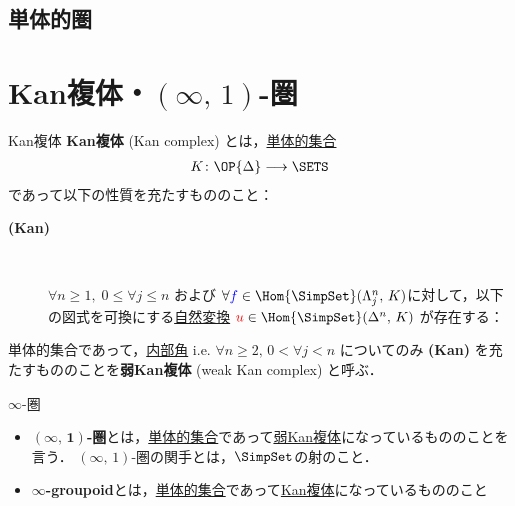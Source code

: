 \documentclass[TQFT_main]{subfiles}
\begin{document}
\subsection{単体的圏}



\section{Kan複体・$(\infty,\, 1)$-圏}

\begin{mydef}[label=def:KanCplx,breakable]{Kan複体}
    \textbf{Kan複体} (Kan complex) とは，\hyperref[def:SimpSet]{単体的集合}
    \begin{align}
        K \colon \OP{\Delta} \lto \SETS
    \end{align}
    であって以下の性質を充たすもののこと：

    \begin{description}
        \item[\textbf{(Kan)}]　
        
        $\forall n \ge 1,\; 0 \le \forall j \le n$ および $\forall \textcolor{blue}{f} \in \Hom{\SimpSet}(\Lambda^n_j,\, K)$に対して，以下の図式を可換にする\hyperref[def:nat]{自然変換} $\textcolor{red}{u} \in \Hom{\SimpSet}(\Delta^n,\, K)$ が存在する：
        \begin{center}
        \end{center}
        
    \end{description}
    
    \tcblower

    単体的集合であって，\hyperref[def:horn]{内部角} i.e. $\forall n \ge 2,\, 0 < \forall j < n$ についてのみ \textsf{\textbf{(Kan)}} を充たすもののことを\textbf{弱Kan複体} (weak Kan complex) と呼ぶ．
\end{mydef}

\begin{mydef}[label=def:infinity-1]{$\infty$-圏}
    \begin{itemize}
        \item $\bm{(\infty,\, 1)}$\textbf{-圏}とは，\hyperref[def:SimpSet]{単体的集合}であって\hyperref[def:KanCplx]{弱Kan複体}になっているもののことを言う．
        $(\infty,\, 1)$-圏の関手とは，\hyperref[def:SimpSet]{$\SimpSet$}の射のこと．
        \item $\bm{\infty}$\textbf{-groupoid}とは，\hyperref[def:SimpSet]{単体的集合}であって\hyperref[def:KanCplx]{Kan複体}になっているもののこと
    \end{itemize}
    
\end{mydef}
\end{document}
